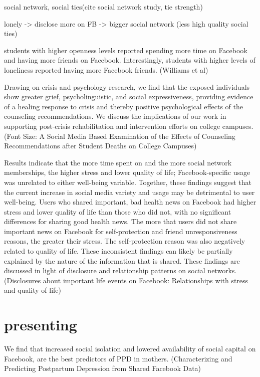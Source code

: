 social network, social ties(cite social network study, tie strength)

lonely  -> disclose more on FB -> bigger social network (less high quality social ties)


students with higher openness levels reported spending more time on Facebook and having more friends on Facebook. Interestingly, students with higher levels of loneliness reported having more Facebook friends. (Williams et al)


 Drawing on crisis and psychology research, we find that the exposed individuals show greater grief, psycholinguistic, and social expressiveness, providing evidence of a healing response to crisis and thereby positive psychological effects of the counseling recommendations. We discuss the implications of our work in supporting post-crisis rehabilitation and intervention efforts on college campuses. (Font Size: 
A Social Media Based Examination of the Effects of Counseling Recommendations after Student Deaths on College Campuses)




 Results indicate that the more time spent on and the more social network memberships, the higher stress and lower quality of life; Facebook-specific usage was unrelated to either well-being variable. Together, these findings suggest that the current increase in social media variety and usage may be detrimental to user well-being. Users who shared important, bad health news on Facebook had higher stress and lower quality of life than those who did not, with no significant differences for sharing good health news. The more that users did not share important news on Facebook for self-protection and friend unresponsiveness reasons, the greater their stress. The self-protection reason was also negatively related to quality of life. These inconsistent findings can likely be partially explained by the nature of the information that is shared. These findings are discussed in light of disclosure and relationship patterns on social networks. (Disclosures about important life events on Facebook: Relationships with stress and quality of life)

\section{presenting}

We find that increased social isolation and lowered availability of social capital on Facebook, are the best predictors of PPD in mothers. (Characterizing and Predicting Postpartum Depression from Shared Facebook Data)


